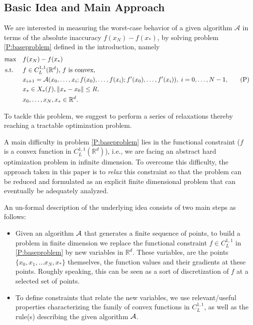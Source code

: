 \documentclass[12pt]{article}
\numberwithin{equation}{section}
\theoremstyle{definition}
\theoremstyle{remark}
\def\real{\mathbb{R}}
\begin{document}
\subsection{Basic Idea and Main Approach}
We are interested in measuring the worst-case behavior of a given algorithm $\mathcal{A}$ in
terms of the absolute inaccuracy  $f(x_N) - f(x_\ast)$, by solving problem
\eqref{P:baseproblem} defined in the introduction, namely
\begin{align*}
    \begin{aligned}
    \max \quad & f(x_N)-f(x_\ast) \\
    \text{s.t. }\quad
                        & f \in C^{1,1}_L(\mathbb{R}^d) \text{, $f$ is convex},\\
                        & x_{i+1}={\cal A}(x_0,\dots,x_i; f(x_0),\dots,f(x_i); f'(x_0),\dots, f'(x_i)), \; i=0,
                        \ldots, N-1,\\
                        & x_\ast \in X_\ast(f), \|x_\ast-x_0\|\leq R,\\
                        & x_0, \ldots, x_N, x_\ast \in\mathbb{R}^d.
    \end{aligned}
    \tag{P}\label{P:baseproblem}
\end{align*}

To tackle this problem, we suggest to perform a series of relaxations %
thereby reaching a tractable optimization problem. %
\medskip

A main difficulty in problem \eqref{P:baseproblem} lies in the functional constraint
($f$ is a convex function in $C^{1,1}_L(\mathbb{R}^d)$),
i.e., we are facing an abstract hard optimization problem in infinite dimension. To overcome
this difficulty,  the approach taken in this paper is to {\em relax} this constraint so that
the problem can be reduced and formulated as an explicit finite dimensional problem that can
eventually be adequately analyzed.

An un-formal description of the underlying idea consists of two main steps as follows:

\begin{itemize}
\item Given an algorithm ${\cal A}$ that generates a finite sequence of points,
to build a problem in finite dimension we
replace the functional constraint $f\in C^{1,1}_L$ in \eqref{P:baseproblem} by new variables in $\real^d$. These
variables, are the points $\{x_0, x_1, \ldots x_N, x_\ast \}$ themselves, the function values
and their gradients at these points. Roughly speaking, this can be seen as a sort of
discretization of $f$ at a selected set of points.
\item To define constraints that relate the new variables, we use relevant/useful
properties characterizing the family of convex functions in $C^{1,1}_L$, as well as the
rule(s) describing the given algorithm ${\cal A}$.
\end{itemize}
\end{document}
